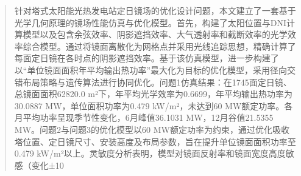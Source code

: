 \begin{abstract}
针对塔式太阳能光热发电站定日镜场的优化设计问题，本文建立了一套基于光学几何原理的镜场性能仿真与优化模型。首先，构建了太阳位置与DNI计算模型以及包含余弦效率、阴影遮挡效率、大气透射率和截断效率的光学效率综合模型。通过将镜面离散化为网格点并采用光线追踪思想，精确计算了每面定日镜在各时点的阴影遮挡效率。基于该仿真模型，进一步构建了以“单位镜面面积年平均输出热功率”最大化为目标的优化模型，采用径向交错布局策略与遗传算法进行协同优化。问题1仿真结果：在1745面定日镜、总镜面面积62820.0 m²下，年平均光学效率为0.6699，年平均输出热功率为30.0887 MW，单位面积功率为0.479 kW/m²，未达到60 MW额定功率。各月平均功率呈现季节性变化，6月峰值36.1031 MW，12月谷值21.5355 MW。问题2与问题3的优化模型以60 MW额定功率为约束，通过优化吸收塔位置、定日镜尺寸、安装高度及布局参数，旨在提升单位镜面面积功率至0.479 kW/m²以上。灵敏度分析表明，模型对镜面反射率和镜面宽度高度敏感（变化±10%

\end{abstract}